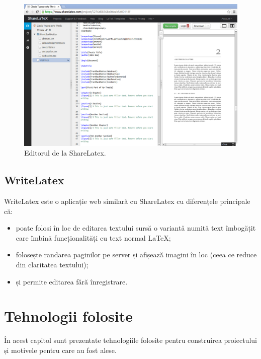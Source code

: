 \documentclass[a4wide,12pt]{report}
\newcommand{\acr}[1]{{\textsmaller[1]{\textsc{#1}}}} %
\begin{document}
\begin{figure}
\begin{center}
\includegraphics[width=15cm]{imagini/sharelatex}
\end{center}
\caption{Editorul de la ShareLatex.}
\label{sharelatexfig}
\end{figure}

\section{WriteLatex}

WriteLatex este o aplicație web similară cu ShareLatex cu diferențele principale
că:

\begin{itemize}

\item poate folosi în loc de editarea textului sursă o variantă numită text
îmbogățit care îmbină funcționalități \acr{WYSIWYG} cu text normal \LaTeX{};

\item folosește randarea paginilor pe server și afișează imagini \acr{JPEG} în
loc (ceea ce reduce din claritatea textului);

\item și permite editarea fără înregistrare.

\end{itemize}

\chapter{Tehnologii folosite}

În acest capitol sunt prezentate tehnologiile folosite pentru construirea
proiectului și motivele pentru care au fost alese.
\end{document}
